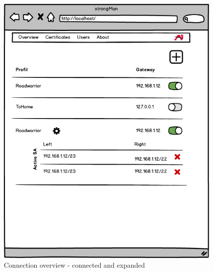 \begin{figure}[H]
	\centering
	\includegraphics[width=400pt]{images/mockups/con_expanded.png}
	\caption{Connection overview - connected and expanded}
\end{figure}

